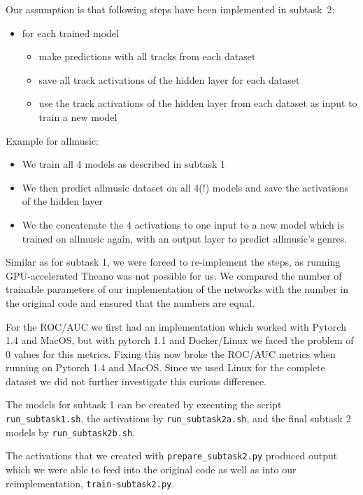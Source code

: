 \documentclass[sigconf,nonacm]{acmart}
\begin{document}
Our assumption is that following steps have been implemented in subtask~2:

\begin{itemize}
  \item for each trained model
  \begin{itemize}
    \item make predictions with all tracks from each dataset
    \item save all track activations of the hidden layer for each dataset
    \item use the track activations of the hidden layer from each dataset as input to train a new model
  \end{itemize}
\end{itemize}

Example for allmusic: 
\begin{itemize}
  \item We train all 4 models as described in subtask 1
  \item We then predict allmusic dataset on all 4(!) models and save the activations of the hidden layer
  \item We the concatenate the 4 activations to one input
  to a new model which is trained on allmusic again, with an
  output layer to predict allmusic's genres.
\end{itemize}

Similar as for subtask 1, we were forced to re-implement the steps,
as running GPU-accelerated Theano was not possible for us.
We compared the number of trainable parameters of our implementation
of the networks with the number in the original code and ensured
that the numbers are equal.

For the ROC/AUC we first had an implementation which worked with
Pytorch 1.4 and MacOS, but with pytorch 1.1 and Docker/Linux
we faced the problem of 0 values for this metrics.
Fixing this now broke the ROC/AUC metrics when running on
Pytorch 1.4 and MacOS.
Since we used Linux for the complete dataset we did not further
investigate this curious difference.

The models for subtask 1 can be created by executing
the script
\texttt{run\_subtask1.sh},
the activations by 
\texttt{run\_subtask2a.sh}, and the final subtask 2
models by \texttt{run\_subtask2b.sh}.

The activations that we created with \texttt{prepare\_subtask2.py}
produced output which we were able to feed into the
original code as well as into our reimplementation, \texttt{train-subtask2.py}.
\end{document}
